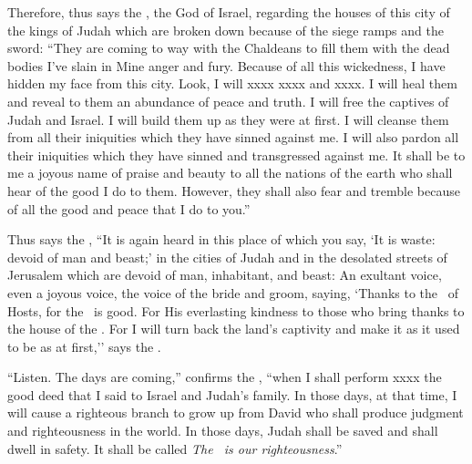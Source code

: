 
\begin{inparaenum}

   Therefore, thus says the \lord, the God of Israel, regarding the houses of this city of the kings of Judah which are broken down because of the siege ramps and the sword:%
   ``They are coming to way with the Chaldeans to fill them with the dead bodies I've slain in Mine anger and fury. Because of all this wickedness, I have hidden my face from this city.%
   Look, I will xxxx xxxx and xxxx. I will heal them and reveal to them an abundance of peace and truth.%
   I will free the captives of Judah and Israel. I will build them up as they were at first.%
   I will cleanse them from all their iniquities which they have sinned against me. I will also pardon all their iniquities which they have sinned and transgressed against me.%
   It shall be to me a joyous name of praise and beauty to all the nations of the earth who shall hear of the good I do to them. However, they shall also fear and tremble because of all the good and peace that I do to you.''%

   Thus says the \lord, ``It is again heard in this place of which you say, `It is waste: devoid of man and beast;' in the cities of Judah and in the desolated streets of Jerusalem which are devoid of man, inhabitant, and beast:%
   An exultant voice, even a joyous voice, the voice of the bride and groom, saying, `Thanks to the \lord\ of Hosts, for the \lord\ is good. For His everlasting kindness to those who bring thanks to the house of the \lord. For I will turn back the land's captivity and make it as it used to be as at first,'' says the \lord.%


   ``Listen. The days are coming,'' confirms the \lord, ``when I shall perform xxxx the good deed that I said to Israel and Judah's family.%
   In those days, at that time, I will cause a righteous branch to grow up from David who shall produce judgment and righteousness in the world.%
   In those days, Judah shall be saved and shall dwell in safety. It shall be called \textit{The \lord\ is our righteousness}.''%


\end{inparaenum}
